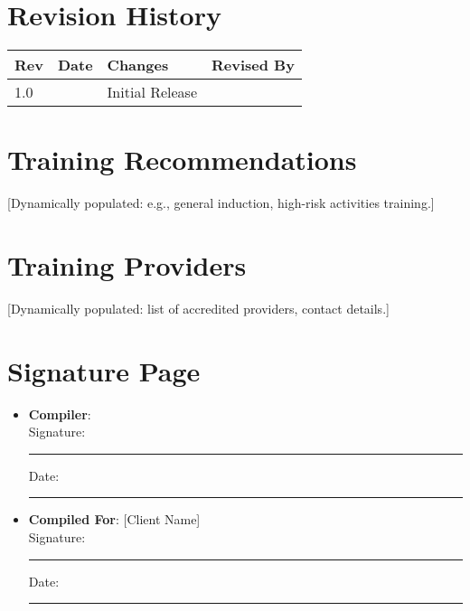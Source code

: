 \documentclass[11pt]{article}
\newcommand{\issueDate}{}
\newcommand{\compilerName}{}
\begin{document}
\section{Revision History}
\begin{tabularx}{\textwidth}{lXll}
  \toprule
  \textbf{Rev} & \textbf{Date} & \textbf{Changes} & \textbf{Revised By} \\
  \midrule
  1.0 & \issueDate & Initial Release & \compilerName \\
  \bottomrule
\end{tabularx}

\section{Training Recommendations}
[Dynamically populated: e.g., general induction, high-risk activities training.]

\section{Training Providers}
[Dynamically populated: list of accredited providers, contact details.]

\section{Signature Page}
\begin{itemize}
  \item \textbf{Compiler}: \compilerName \\
    Signature: \rule{5cm}{0.4pt} \quad Date: \rule{3cm}{0.4pt}
  \item \textbf{Compiled For}: [Client Name] \\
    Signature: \rule{5cm}{0.4pt} \quad Date: \rule{3cm}{0.4pt}
\end{itemize}
\end{document}
